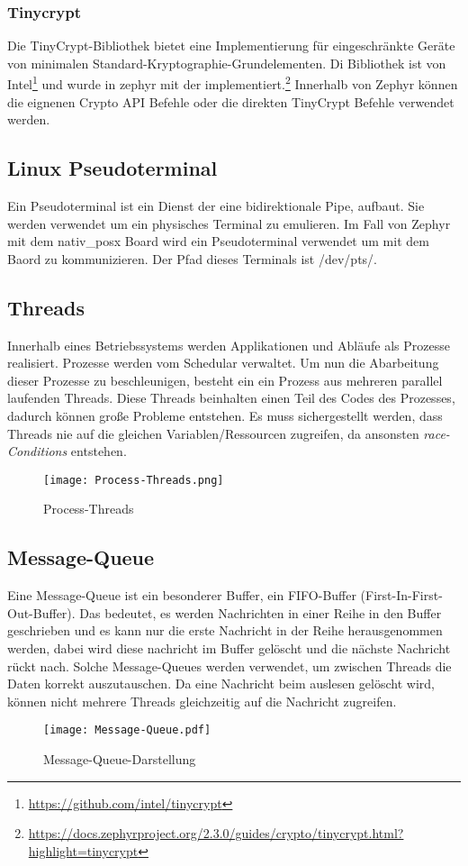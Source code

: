 \newpage
    \subsubsection{Tinycrypt}
    Die TinyCrypt-Bibliothek bietet eine Implementierung für eingeschränkte Geräte von minimalen Standard-Kryptographie-Grundelementen.
    Di Bibliothek ist von Intel\footnote{\url{https://github.com/intel/tinycrypt}} und wurde in zephyr mit der implementiert.\footnote{\url{https://docs.zephyrproject.org/2.3.0/guides/crypto/tinycrypt.html?highlight=tinycrypt}} 
    Innerhalb von Zephyr können die eignenen Crypto API Befehle oder die direkten TinyCrypt Befehle verwendet werden. 

     
\subsection{Linux Pseudoterminal}
Ein Pseudoterminal ist ein Dienst der eine bidirektionale Pipe, aufbaut. Sie werden verwendet um ein physisches Terminal zu emulieren. 
Im Fall von Zephyr mit dem nativ\_posx Board wird ein Pseudoterminal verwendet um mit dem Baord zu kommunizieren. Der Pfad dieses Terminals ist /dev/pts/.
\subsection{Threads}
Innerhalb eines Betriebssystems werden Applikationen und Abläufe als Prozesse realisiert. Prozesse werden vom Schedular verwaltet. Um nun die Abarbeitung dieser Prozesse zu 
beschleunigen, besteht ein ein Prozess aus mehreren parallel laufenden Threads. Diese Threads beinhalten einen Teil des Codes des Prozesses, dadurch können große Probleme entstehen. 
Es muss sichergestellt werden, dass Threads nie auf die gleichen Variablen/Ressourcen zugreifen, da ansonsten \textit{race-Conditions} entstehen. 
\begin{figure}[!htb]
    \centering
    \texttt{[image: Process-Threads.png]}
    \caption{Process-Threads}
    \label{caption:Process-Threads}
\end{figure}

\newpage
\subsection{Message-Queue}
Eine Message-Queue ist ein besonderer Buffer, ein FIFO-Buffer (First-In-First-Out-Buffer). Das bedeutet, es werden Nachrichten in einer Reihe in den Buffer geschrieben und es kann nur die
erste Nachricht in der Reihe herausgenommen werden, dabei wird diese nachricht im Buffer gelöscht und die nächste Nachricht rückt nach. 
Solche Message-Queues werden verwendet, um zwischen Threads die Daten korrekt auszutauschen. Da eine Nachricht beim auslesen gelöscht wird, können nicht mehrere Threads gleichzeitig auf 
die Nachricht zugreifen. 
\begin{figure}[!ht]
    \centering
    \texttt{[image: Message-Queue.pdf]}
    \caption{Message-Queue-Darstellung}
    \label{fig:Message-Queue-Darstellung}
\end{figure}